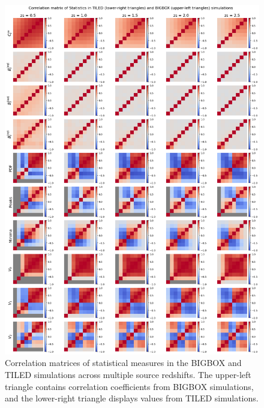 \begin{figure}[p]
    \centering
    \includegraphics[width=\textwidth]{figures/results/corr_main.png}
    \caption[Correlation Matrices of Statistical Measures in BIGBOX and TILED Simulations]{Correlation matrices of statistical measures in the BIGBOX and TILED simulations across multiple source redshifts. The upper-left triangle contains correlation coefficients from BIGBOX simulations, and the lower-right triangle displays values from TILED simulations.}
    \label{fig:corr_main}
\end{figure}

